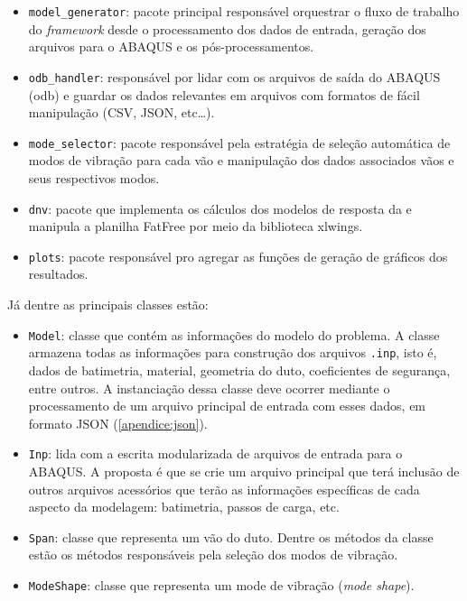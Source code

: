 \begin{itemize}
    \item \texttt{model\_generator}: pacote principal responsável orquestrar o fluxo de trabalho do \textit{framework} desde o processamento dos dados de entrada, geração dos arquivos para o ABAQUS e os pós-processamentos.

    \item \texttt{odb\_handler}: responsável por lidar com os arquivos de saída do ABAQUS (odb) e guardar os dados relevantes em arquivos com formatos de fácil manipulação (CSV, JSON, etc\ldots).

    \item \texttt{mode\_selector}: pacote responsável pela estratégia de seleção automática de modos de vibração para cada vão e manipulação dos dados associados vãos e seus respectivos modos.

    \item \texttt{dnv}: pacote que implementa os cálculos dos modelos de resposta da  e manipula a planilha FatFree por meio da biblioteca xlwings.

    \item \texttt{plots}: pacote responsável pro agregar as funções de geração de gráficos dos resultados.
\end{itemize}

Já dentre as principais classes estão:

\begin{itemize}
    \item \texttt{Model}: classe que contém as informações do modelo do problema.
    A classe armazena todas as informações para construção dos arquivos \texttt{.inp}, isto é, dados de batimetria, material, geometria do duto, coeficientes de segurança, entre outros.
    A instanciação dessa classe deve ocorrer mediante o processamento de um arquivo principal de entrada com esses dados, em formato JSON (\autoref{apendice:json}).

    \item \texttt{Inp}: lida com a escrita modularizada de arquivos de entrada  para o ABAQUS. A proposta é que se crie um arquivo principal que terá inclusão de outros arquivos acessórios que terão as informações específicas de cada aspecto da modelagem: batimetria, passos de carga, etc.

    \item \texttt{Span}: classe que representa um vão do duto. Dentre os métodos da classe estão os métodos responsáveis pela seleção dos modos de vibração.

    \item \texttt{ModeShape}: classe que representa um mode de vibração (\textit{mode shape}).
\end{itemize}

